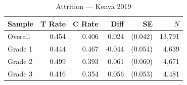 \begin{table}[htbp]
\centering
\small
\caption{Attrition --- Kenya 2019}
\label{tab:ke2_attrition}
\begin{tabular}{l*{5}{r}}
\toprule
Sample & T Rate & C Rate & Diff & SE & $N$ \\
\midrule
Overall & 0.454 & 0.406 & 0.024 & (0.042) & 13,791 \\
\addlinespace
Grade 1 & 0.444 & 0.467 & -0.044 & (0.054) & 4,639 \\
Grade 2 & 0.499 & 0.393 & 0.061 & (0.060) & 4,671 \\
Grade 3 & 0.416 & 0.354 & 0.056 & (0.053) & 4,481 \\
\bottomrule
\end{tabular}
\end{table}